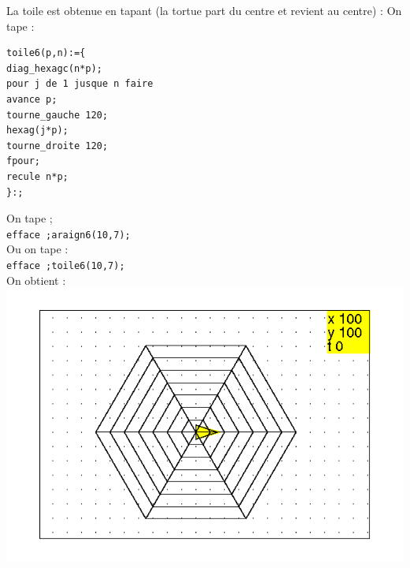 \documentclass[a4paper,11pt]{book}
\begin{document}
La toile est obtenue en tapant (la tortue part du centre et revient au centre) :
On tape :
\begin{verbatim}
toile6(p,n):={
diag_hexagc(n*p);
pour j de 1 jusque n faire 
avance p;
tourne_gauche 120;
hexag(j*p);
tourne_droite 120;
fpour;
recule n*p;
}:;
\end{verbatim}
On tape ;\\
{\tt efface ;araign6(10,7);}\\
Ou on tape :\\
{\tt efface ;toile6(10,7);}\\
On obtient :\\
\includegraphics[width=\textwidth]{tortaraign}
\end{document}
